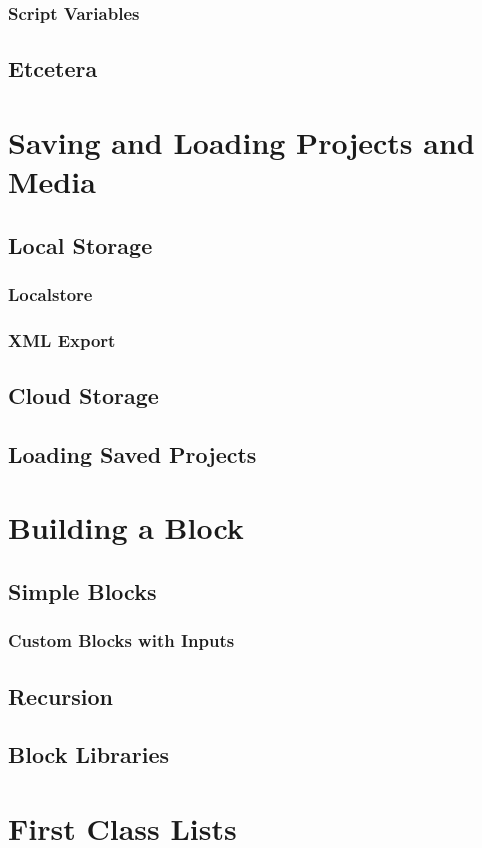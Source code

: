 \documentclass{report}
\begin{document}
\subsection{Script Variables}
\section{Etcetera}
\chapter{Saving and Loading Projects and Media}
\section{Local Storage}
\subsection{Localstore}
\subsection{XML Export}
\section{Cloud Storage}
\section{Loading Saved Projects}
\chapter{Building a Block}
\section{Simple Blocks}
\subsection{Custom Blocks with Inputs}
\section{Recursion}
\section{Block Libraries}
\chapter{First Class Lists}
\end{document}
